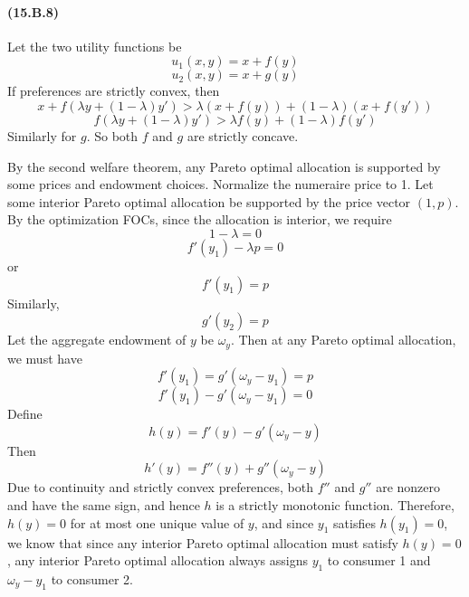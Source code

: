 \documentclass[10pt,letter]{article}
\begin{document}
\begin{enumerate}[label=(\alph*)]
\end{enumerate}
\paragraph{(15.B.8)} Let the two utility functions be
\[ u_1(x,y) = x + f(y) \]
\[ u_2(x,y) = x + g(y) \]
If preferences are strictly convex, then
\[  x +  f(\lambda y + (1-\lambda)y')  > \lambda (x+f(y)) + (1-\lambda)(x + f(y')) \]
\[ f(\lambda y + (1-\lambda)y')> \lambda f(y) + (1-\lambda) f(y')  \]
Similarly for $g$. So both $f$ and $g$ are strictly concave.

By the second welfare theorem, any Pareto optimal allocation is supported by some prices and endowment choices. Normalize the numeraire price to 1. Let some interior Pareto optimal allocation be supported by the price vector $(1, p)$. By the optimization FOCs, since the allocation is interior, we require
\[ 1 - \lambda = 0 \]
\[ f'(y_1) - \lambda p =0 \]
or
\[ f'(y_1) = p \]
Similarly,
\[ g'(y_2) = p \]
Let the aggregate endowment of $y$ be $\omega_y$. Then at any Pareto optimal allocation, we must have
\[ f'(y_1) = g'(\omega_y - y_1) = p \]
\[ f'(y_1) - g'(\omega_y - y_1) = 0 \]
Define
\[ h(y) = f'(y) - g'(\omega_y - y) \]
Then
\[ h'(y) = f''(y) + g''(\omega_y - y) \]
Due to continuity and strictly convex preferences, both $f''$ and $g''$ are nonzero and have the same sign, and hence $h$ is a strictly monotonic function. Therefore, $h(y) = 0$ for at most one unique value of $y$, and since $y_1$ satisfies $h(y_1) = 0$, we know that since any interior Pareto optimal allocation must satisfy $h(y) = 0$, any interior Pareto optimal allocation always assigns $y_1$ to consumer 1 and $\omega_y - y_1$ to consumer 2.
\end{document}
